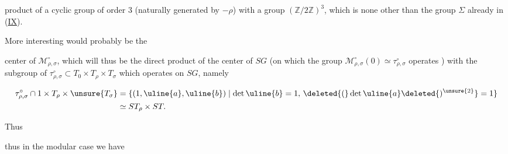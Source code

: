 product of a cyclic group of order $3$ (naturally generated by $-\rho$) with a group $(\mathbb Z/2\mathbb Z)^3$, which is none other than the group $\Sigma$ already in (\uline{IX}).

More interesting would probably be the


center of $\mathcal{M}_{\rho,\sigma}^{\circ}$, which will thus be the direct product of the center  of $SG$ (on which the  group $\mathcal{M}_{\rho,\sigma}^{\circ}(0)\simeq\tau_{\rho,\sigma}^{\circ}$ operates ) with the subgroup of $\tau_{\rho,\sigma}^{\circ}\subset T_0\times T_\rho\times T_\sigma$ which operates  on $SG$, namely \deleted{$\unsure{\tau_{\rho,\sigma}}$}


\[
\begin{aligned}
\tau_{\rho,\sigma}^{\circ}\cap 1\times T_\rho\times\unsure{T_\sigma}
 &=\{(1,\uline{a},\uline{b})\mid\det\uline{b}=1,\,
 \deleted{(}\det\uline{a}\deleted{)^{\unsure{2}}}=1\}\\
 &\simeq ST_\rho\times ST.
\end{aligned}
\]

Thus

\deleted{\diagram{\[\begin{array}{rcl}
(53)\quad\uline{\mathrm{Centre}}(\mathcal{M}_{\rho,\sigma}^{\circ})
 &=&(1\times ST_\rho\times ST_\sigma)\times\mu_2\quad,\\
 &&\hfill\cap\qquad\\[-2pt]
 &&\hfill SG\qquad
\end{array}\]}}


thus in the modular case we have


